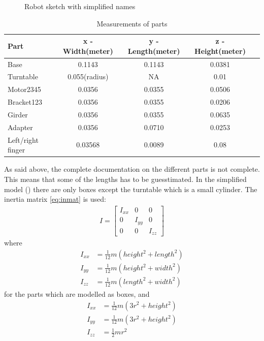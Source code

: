\begin{figure}[htbp]
  \centering
  
  \caption{Robot sketch with simplified names}
  \label{fig:naming}
\end{figure}
\begin{table}[htbp]
\centering
\caption{Measurements of parts}
\label{table:measurements}
    \begin{tabular}{l c c c r}
        \toprule
        Part  &  x - Width(meter) & y - Length(meter) & z - Height(meter)\\
        \midrule
        Base & 0.1143 & 0.1143 & 0.0381\\
        Turntable & 0.055(radius) & NA & 0.01\\
        Motor2345 & 0.0356 & 0.0355 & 0.0506 \\
        Bracket123 & 0.0356 & 0.0355 & 0.0206 \\
        Girder & 0.0356 & 0.0355 & 0.0635\\
        Adapter & 0.0356 & 0.0710 & 0.0253\\
        Left/right finger & 0.03568 & 0.0089 & 0.08\\
        \bottomrule
    \end{tabular}
\end{table}
As said above, the complete documentation on the different parts is not complete. This means that some of the lengths has to be guesstimated\cite{Crustcrawler}. In the simplified model () there are only boxes except the turntable which is a small cylinder. The inertia matrix \eqref{eq:inmat} is used:
\begin{align}\label{eq:inmat}
    I = 
    \begin{bmatrix}
        I_{xx} & 0 & 0\\
        0 & I_{yy} & 0\\
        0 & 0 & I_{zz}
    \end{bmatrix}
\end{align}
where
\begin{align*}
    I_{xx} &= \frac{1}{12}m(height^2+length^2)\\
    I_{yy} &= \frac{1}{12}m(height^2+width^2)\\
    I_{zz} &= \frac{1}{12}m(length^2+width^2)
\end{align*}
for the parts which are modelled as boxes, and 
\begin{align*}
    I_{xx} &= \frac{1}{12}m(3r^2+height^2)\\
    I_{yy} &= \frac{1}{12}m(3r^2+height^2)\\
    I_{zz} &= \frac{1}{2}mr^2
\end{align*}
